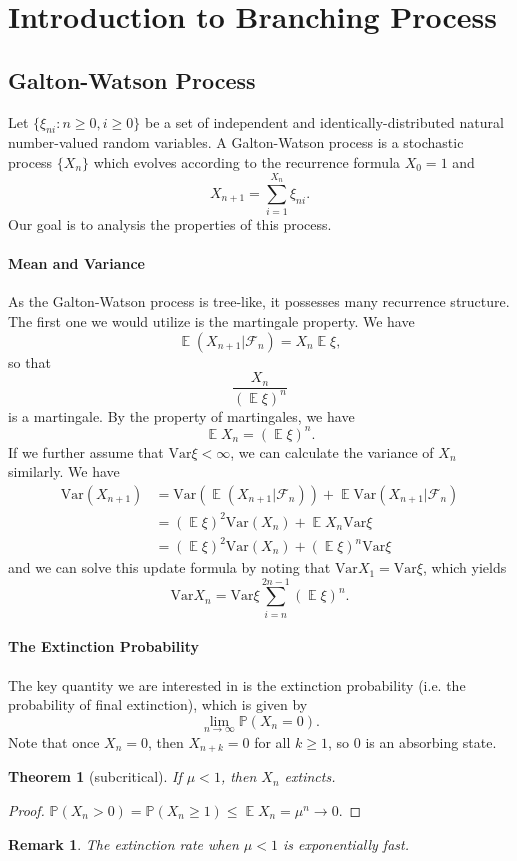 \documentclass{article}
\newtheorem{Thm}{Theorem}[section]
\newtheorem*{Rk}{Remark}
\theoremstyle{definition}
\newcommand{\EE}{\operatorname{\mathbb{E}}}
\newcommand{\PP}{\mathbb{P}}
\renewcommand{\leq}{\leqslant}
\renewcommand{\geq}{\geqslant}
\newcommand{\cF}{\mathcal{F}}
\newcommand{\<}{\left\langle}
\renewcommand{\>}{\right\rangle}
\newcommand{\var}{\text{Var}}
\begin{document}
\section{Introduction to Branching Process}
\subsection{Galton-Watson Process}
Let $\{\xi_{ni}:n\geq 0,i\geq 0\}$ be a set of independent and identically-distributed natural number-valued random variables.
A Galton-Watson process is a stochastic process $\{X_n\}$ which evolves according to the recurrence formula $X_0 = 1$ and 
\[ X_{n+1}=\sum_{i=1}^{X_n}\xi_{ni}.\]
Our goal is to analysis the properties of this process.

\paragraph{Mean and Variance} As the Galton-Watson process is tree-like, it possesses many recurrence structure.
The first one we would utilize is the martingale property. We have 
\[\EE(X_{n+1}|\cF_n)=X_n\EE \xi ,\]
so that \[\frac{X_n}{(\EE \xi)^n}\]
is a martingale. By the property of martingales, we have 
\[\EE X_{n}=(\EE \xi)^n.\]
If we further assume that $\var \xi<\infty$, we can calculate the variance of $X_n$ similarly. 
We have
\begin{align*}
    \var (X_{n+1}) &= \var (\EE(X_{n+1}|\cF_n))+\EE \var(X_{n+1}|\cF_n)\\
    &=(\EE \xi)^2\var(X_n)+\EE X_n \var \xi\\
    &=(\EE \xi)^2\var(X_n)+(\EE \xi)^n \var \xi
\end{align*}
and we can solve this update formula by noting that $\var X_{1}=\var \xi $, which yields
\[\var X_{n}=\var \xi \sum_{i=n}^{2n-1} (\EE \xi)^n.\]

\paragraph{The Extinction Probability} The key quantity we are interested in is the
extinction probability (i.e. the probability of final extinction), which is given by
\[ \lim_{n\to\infty}\PP(X_n=0).\]
Note that once $X_n=0$, then $X_{n+k}=0$ for all $k\geq 1$, so $0$ is an absorbing state.

\begin{Thm}[subcritical]
    If $\mu<1$, then $X_n$ extincts.
\end{Thm}
\begin{proof}
    $\PP(X_n>0)=\PP(X_n\geq 1)\leq \EE X_n = \mu^n\to 0$.
\end{proof}
\begin{Rk}
    The extinction rate when $\mu<1$ is exponentially fast.
\end{Rk}
\end{document}
